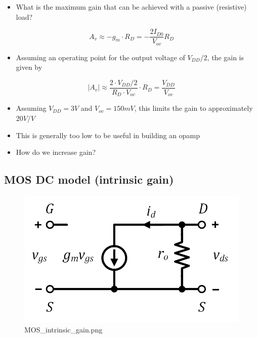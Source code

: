 \documentclass[11pt]{article}
\providecommand{\tightlist}{%
      \setlength{\itemsep}{0pt}\setlength{\parskip}{0pt}}
\begin{document}
    \begin{itemize}
\tightlist
\item
  What is the maximum gain that can be achieved with a passive
  (resistive) load?
\end{itemize}

\begin{equation}
A_v \approx -g_m\cdot R_D = -\dfrac{2I_{D0}}{V_{ov}}R_D
\end{equation}

\begin{itemize}
\tightlist
\item
  Assuming an operating point for the output voltage of \(V_{DD}/2\),
  the gain is given by
\end{itemize}

\begin{equation}
|A_v| \approx \dfrac{2\cdot V_{DD}/2}{R_D\cdot V_{ov}}\cdot R_D = \dfrac{V_{DD}}{V_{ov}}
\end{equation}

\begin{itemize}
\tightlist
\item
  Assuming \(V_{DD} = 3V\) and \(V_{ov} = 150mV\), this limits the gain
  to approximately \(20V/V\)
\item
  This is generally too low to be useful in building an opamp
\item
  How do we increase gain?
\end{itemize}

    \hypertarget{mos-dc-model-intrinsic-gain}{%
\subsection{MOS DC model (intrinsic
gain)}\label{mos-dc-model-intrinsic-gain}}

    \begin{figure}
\centering
\includegraphics{MOS_intrinsic_gain.png}
\caption{MOS\_intrinsic\_gain.png}
\end{figure}
\end{document}
